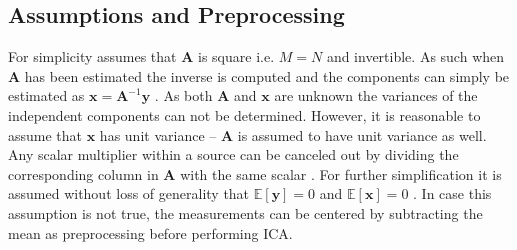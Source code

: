 \subsection{Assumptions and Preprocessing}
For simplicity assumes that $\mathbf{A}$ is square i.e. $M = N$ and invertible. 
As such when $\mathbf{A}$ has been estimated the inverse is computed and the components can simply be estimated as $\mathbf{x} = \mathbf{A}^{-1} \mathbf{y}$ \cite[p. 152-153]{ICA}.
As both $\mathbf{A}$ and $\mathbf{x}$ are unknown the variances of the independent components can not be determined. 
However, it is reasonable to assume that $\mathbf{x}$ has unit variance -- $\mathbf{A}$ is assumed to have unit variance as well. 
Any scalar multiplier within a source can be canceled out by dividing the corresponding column in $\mathbf{A}$ with the same scalar \cite[p. 154]{ICA}.
For further simplification it is assumed without loss of generality that $\mathbb{E}[\mathbf{y}] = 0$ and $\mathbb{E}[\mathbf{x}] = 0$ \cite[p. 154]{ICA}. 
In case this assumption is not true, the measurements can be centered by subtracting the mean as preprocessing before performing ICA.

